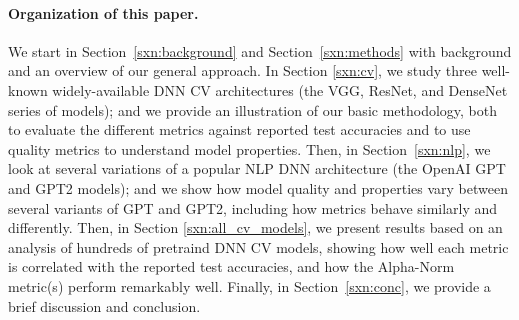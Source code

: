 \paragraph{Organization of this paper.}

We start in Section~\ref{sxn:background} and Section~\ref{sxn:methods} with background and an overview of our general approach.
In Section \ref{sxn:cv}, we study three well-known widely-available DNN CV architectures (the VGG, ResNet, and DenseNet series of models); and we provide an illustration of our basic methodology, both to evaluate the different metrics against reported test accuracies and to use quality metrics to understand model properties.
Then, in Section~\ref{sxn:nlp}, we look at several variations of a popular NLP DNN architecture (the OpenAI GPT and GPT2 models); and we show how model quality and properties vary between several variants of GPT and GPT2, including how metrics behave similarly and differently.
Then, in Section \ref{sxn:all_cv_models}, we present results based on an analysis of hundreds of pretraind DNN CV models, showing how well each metric is correlated with the reported test accuracies, and how the Alpha-Norm metric(s) perform remarkably well.
Finally, in Section~\ref{sxn:conc}, we provide a brief discussion and conclusion.

